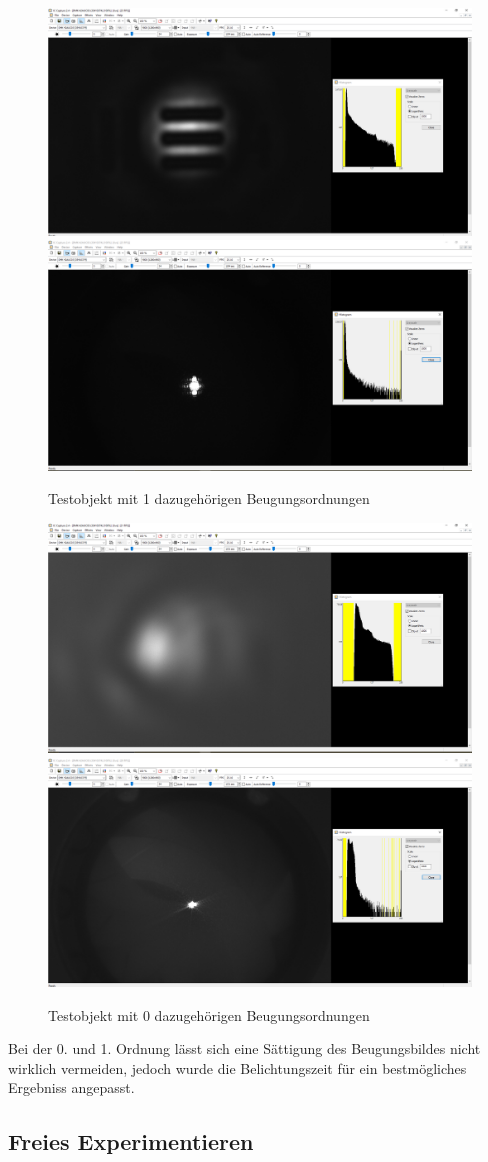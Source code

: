 \documentclass[12pt,a4paper,twoside]{article}
\begin{document}
\begin{figure}[H]
    \centering
    \includegraphics[width=0.45\linewidth]{nudes/AbbeTheorie/Aufgabe 2/horizontal/1te ohne.PNG}
    \includegraphics[width=0.45\linewidth]{nudes/AbbeTheorie/Aufgabe 2/horizontal/1te mit.PNG}
    \caption{Testobjekt mit 1 dazugehörigen Beugungsordnungen}
    \label{fig:Aufabe2-1O}
\end{figure}

\begin{figure}[H]
    \centering
    \includegraphics[width=0.45\linewidth]{nudes/AbbeTheorie/Aufgabe 2/horizontal/0te ohne.PNG}
    \includegraphics[width=0.45\linewidth]{nudes/AbbeTheorie/Aufgabe 2/horizontal/0te mit.PNG}
    \caption{Testobjekt mit 0 dazugehörigen Beugungsordnungen}
    \label{fig:Aufabe2-0O}
\end{figure}

\noindent
Bei der 0. und 1. Ordnung lässt sich eine Sättigung des Beugungsbildes nicht wirklich vermeiden, jedoch wurde die Belichtungszeit für ein bestmögliches Ergebniss angepasst.


\subsection{Freies Experimentieren}
\end{document}
